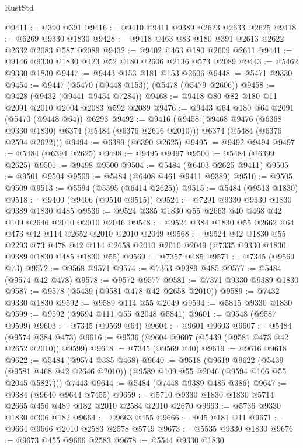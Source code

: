 \begin{lexlean}{RustStd}
\begin{coremodule}
@9411 := @390 @391
@9416 := @9410 @9411 @9389 @2623 @2633 @2625
@9418 := @6269 @9330 @1830
@9428 := @9418 @463 @83 @180 @391 @2613 @2622 @2632 @2083 @587 @2089
@9432 := @9402 @463 @180 @2609 @2611
@9441 := @9146 @9330 @1830 @423 @52 @180 @2606 @2136 @573 @2089
@9443 := @5462 @9330 @1830
@9447 := @9443 @153 @181 @153 @2606
@9448 := @5471 @9330
@9454 := @9447 (@5470 (@9448 @153)) (@5478 (@5479 @2606))
@9458 := @9428 (@9432 (@9441 @9454 @7284))
@9468 := @9418 @80 @82 @180 @11 @2091 @2010 @2004 @2083 @592 @2089
@9476 := @9443 @64 @180 @64 @2091 (@5470 (@9448 @64)) @6293
@9492 := @9416
    (@9458
      (@9468 @9476 (@6368 @9330 @1830) @6374 (@5484 (@6376 @2616 @2010)))
      @6374
      (@5484 (@6376 @2594 @2622)))
@9494 := @6389 (@6390 @2625)
@9495 := @9492 @9494
@9497 := @5484 (@6394 @2625)
@9498 := @9495 @9497
@9500 := @5484 (@6399 @2625)
@9501 := @9498 @9500
@9504 := @5484 (@6403 @2625 @9411)
@9505 := @9501 @9504
@9509 := @5484 (@6408 @461 @9411 @9389)
@9510 := @9505 @9509
@9513 := @5594 (@5595 (@6414 @2625))
@9515 := @5484 (@9513 @1830)
@9518 := @9400 (@9406 (@9510 @9515))
@9524 := @7291 @9330 @9330 @1830 @9389 @1830 @485
@9536 := @9524 @385 @1830 @55 @2663 @40 @468 @42 @109 @2646 @2010 @2010 @2046
@9548 := @9524 @384 @1830 @55 @2662 @64 @473 @42 @114 @2652 @2010 @2010 @2049
@9568 := @9524
    @42
    @1830
    @55
    @2293
    @73
    @478
    @42
    @114
    @2658
    @2010
    @2010
    @2049
    (@7335 @9330 @1830 @9389 @1830 @485 @1830 @55)
@9569 := @7357 @485
@9571 := @7345 (@9569 @73)
@9572 := @9568 @9571
@9574 := @7363 @9389 @485
@9577 := @5484 (@9574 @42 @478)
@9578 := @9572 @9577
@9581 := @7371 @9330 @9389 @1830
@9587 := @9578 (@5439 (@9581 @478 @42 @2658 @2010))
@9589 := @7432 @9330 @1830
@9592 := @9589 @114 @55 @2049
@9594 := @5815 @9330 @1830
@9599 := @9592 (@9594 @111 @55 @2048 @5841)
@9601 := @9548 (@9587 @9599)
@9603 := @7345 (@9569 @64)
@9604 := @9601 @9603
@9607 := @5484 (@9574 @384 @473)
@9616 := @9536 (@9604 @9607 (@5439 (@9581 @473 @42 @2652 @2010)) @9599)
@9618 := @7345 (@9569 @40)
@9619 := @9616 @9618
@9622 := @5484 (@9574 @385 @468)
@9640 := @9518
    (@9619
      @9622
      (@5439 (@9581 @468 @42 @2646 @2010))
      (@9589 @109 @55 @2046 (@9594 @106 @55 @2045 @5827)))
    @7443
@9644 := @5484 (@7448 @9389 @485 @386)
@9647 := @9384 (@9640 @9644 @7455)
@9659 := @5710 @9330 @1830 @1830 @5714 @2665 @456 @489 @182 @2010 @2584 @2010 @2670
@9663 := @5736 @9330 @1830 @306 @182
@9664 := @9663 @455
@9666 := @45 @181 @11
@9671 := @9664 @9666 @2010 @2583 @2578 @5749
@9673 := @5535 @9330 @1830
@9676 := @9673 @455 @9666 @2583
@9678 := @5544 @9330 @1830

\end{coremodule}
\end{lexlean}
